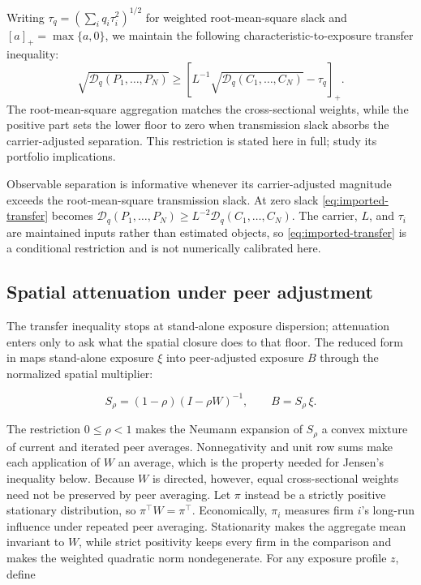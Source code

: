 Writing $\tau_q=(\sum_i q_i\tau_i^2)^{1/2}$ for weighted
root-mean-square slack and $[a]_+=\max\{a,0\}$, we maintain the
following characteristic-to-exposure transfer inequality:
\begin{equation}\label{eq:imported-transfer}
  \sqrt{\mathcal D_q(P_1,\dots,P_N)}
  \geq
  \left[L^{-1}\sqrt{\mathcal D_q(C_1,\dots,C_N)}-\tau_q\right]_+.
\end{equation}
The root-mean-square aggregation matches the cross-sectional weights,
while the positive part sets the lower floor to zero when
transmission slack absorbs the carrier-adjusted separation.
This restriction is stated here in full;
\citet{gawronsky_distance_mpt_2026} study its portfolio implications.

Observable separation is informative whenever its carrier-adjusted
magnitude exceeds the root-mean-square transmission slack.
At zero slack \eqref{eq:imported-transfer} becomes $\mathcal
D_q(P_1,\ldots,P_N)\geq L^{-2}\mathcal D_q(C_1,\ldots,C_N)$.
The carrier, $L$, and $\tau_i$ are maintained inputs rather than
estimated objects, so \eqref{eq:imported-transfer} is a conditional
restriction and is not numerically calibrated here.

\subsection{Spatial attenuation under peer adjustment}

The transfer inequality stops at stand-alone exposure dispersion;
attenuation enters only to ask what the spatial closure does to that floor.
The reduced form in  maps stand-alone
exposure $\xi$ into peer-adjusted exposure $B$ through the normalized
spatial multiplier:

\begin{equation}\label{eq:sar-multiplier}
  S_\rho=(1-\rho)(I-\rho W)^{-1},
  \qquad B=S_\rho\,\xi .
\end{equation}

The restriction $0\leq\rho<1$ makes the Neumann expansion of $S_\rho$
a convex mixture of current and iterated peer averages.
Nonnegativity and unit row sums make each application of $W$ an
average, which is the property needed for Jensen's inequality below.
Because $W$ is directed, however, equal cross-sectional weights need
not be preserved by peer averaging.
Let $\pi$ instead be a strictly positive stationary distribution, so
$\pi^\top W=\pi^\top$.
Economically, $\pi_i$ measures firm $i$'s long-run influence under
repeated peer averaging.
Stationarity makes the aggregate mean invariant to $W$, while strict
positivity keeps every firm in the comparison and makes the weighted
quadratic norm nondegenerate.
For any exposure profile $z$, define

